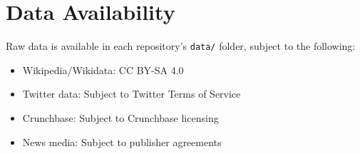 \documentclass[../main.tex]{subfiles}
\begin{document}
\section{Data Availability}

Raw data is available in each repository's \texttt{data/} folder, subject to the following:

\begin{itemize}
\item Wikipedia/Wikidata: CC BY-SA 4.0
\item Twitter data: Subject to Twitter Terms of Service
\item Crunchbase: Subject to Crunchbase licensing
\item News media: Subject to publisher agreements
\end{itemize}

\end{document}
